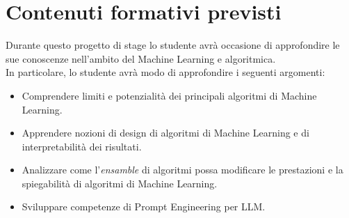 \section{Contenuti formativi previsti}
Durante questo progetto di stage lo studente avrà occasione di approfondire le sue conoscenze nell'ambito del Machine Learning e algoritmica.
\\In particolare, lo studente avrà modo di approfondire i seguenti argomenti:
\begin{itemize}
    \item Comprendere limiti e potenzialità dei principali algoritmi di Machine Learning.
    \item Apprendere nozioni di design di algoritmi di Machine Learning e di interpretabilità dei risultati.
    \item Analizzare come l'\textit{ensamble} di algoritmi possa modificare le prestazioni e la spiegabilità di algoritmi di Machine Learning.
    \item Sviluppare competenze di Prompt Engineering per LLM.
\end{itemize}
\newpage